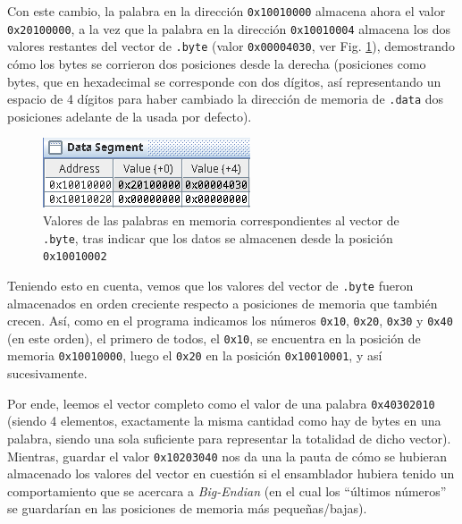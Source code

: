\documentclass[a4paper]{report}
\begin{document}
\vspace{7pt}
\inputminted[linenos]{gas}{src/cuestiones/c1-10.asm}
\vspace{7pt}

Con este cambio, la palabra en la dirección \texttt{0x10010000} almacena ahora el valor \texttt{0x20100000}, a la vez que la palabra en la dirección \texttt{0x10010004} almacena los dos valores restantes del vector de \texttt{.byte} (valor \texttt{0x00004030}, ver Fig. \ref{fig:bytes-shift-endian}), demostrando cómo los bytes se corrieron dos posiciones desde la derecha (posiciones como bytes, que en hexadecimal se corresponde con dos dígitos, así representando un espacio de 4 dígitos para haber cambiado la dirección de memoria de \texttt{.data} dos posiciones adelante de la usada por defecto).

\begin{figure}[h]
    \centering
    \captionsetup{justification = centering}
    \includegraphics[width=.4\linewidth]{img/c1-10}
    \caption{Valores de las palabras en memoria correspondientes al vector de \texttt{.byte}, tras indicar que los datos se almacenen desde la posición \texttt{0x10010002}}
    \label{fig:bytes-shift-endian}
\end{figure}

Teniendo esto en cuenta, vemos que los valores del vector de \texttt{.byte} fueron almacenados en orden creciente respecto a posiciones de memoria que también crecen. Así, como en el programa indicamos los números \texttt{0x10}, \texttt{0x20}, \texttt{0x30} y \texttt{0x40} (en este orden), el primero de todos, el \texttt{0x10}, se encuentra en la posición de memoria \texttt{0x10010000}, luego el \texttt{0x20} en la posición \texttt{0x10010001}, y así sucesivamente.

Por ende, leemos el vector completo como el valor de una palabra \texttt{0x40302010} (siendo 4 elementos, exactamente la misma cantidad como hay de bytes en una palabra, siendo una sola suficiente para representar la totalidad de dicho vector). Mientras, guardar el valor \texttt{0x10203040} nos da una la pauta de cómo se hubieran almacenado los valores del vector en cuestión si el ensamblador hubiera tenido un comportamiento que se acercara a \textit{Big-Endian} (en el cual los ``últimos números'' se guardarían en las posiciones de memoria más pequeñas/bajas).
\end{document}
